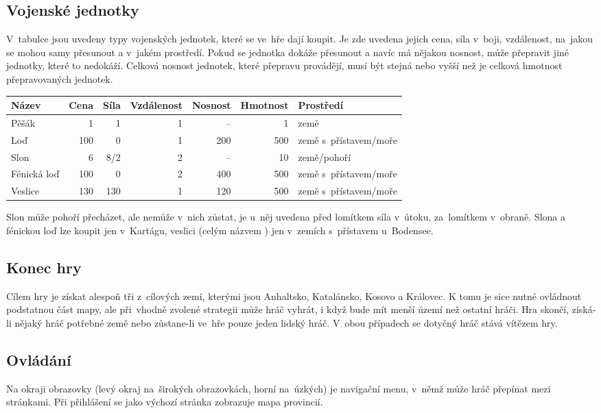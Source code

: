\documentclass[a4paper,12pt]{article}
\begin{document}
\subsection{Vojenské jednotky}
V~tabulce jsou uvedeny typy vojenských jednotek, které se ve~hře dají koupit. Je zde uvedena jejich cena, síla v~boji, vzdálenost, na~jakou se mohou samy přesunout a v~jakém prostředí. Pokud se jednotka dokáže přesunout a navíc má nějakou nosnost, může přepravit jiné jednotky, které to nedokáží. Celková nosnost jednotek, které přepravu provádějí, musí být stejná nebo vyšší než je celková hmotnost přepravovaných jednotek.

\begin{tabular}{l r r r r r l}
Název		& Cena	& Síla	& Vzdálenost	&Nosnost& Hmotnost	& Prostředí\\ \hline
Pěšák		& 1		& 1		& 1			& --		& 1			& země\\
Loď			& 100	& 0		& 1			& 200	& 500		& země s~přístavem/moře\\
Slon			& 6		& 8/2	& 2			& --		& 10			& země/pohoří\\
Fénická loď	& 100	& 0		& 2			& 400	& 500		& země s~přístavem/moře\\
Veslice		& 130	& 130	& 1			& 120	& 500		& země s~přístavem/moře\\
\end{tabular}

Slon může pohoří přecházet, ale nemůže v~nich zůstat, je u~něj uvedena před lomítkem síla v~útoku, za~lomítkem v~obraně. Slona a fénickou loď lze koupit jen v~Kartágu, veslici (celým názvem ) jen v~zemích s~přístavem u~Bodensee.
\subsection{Konec hry}
Cílem hry je získat alespoň tři z~cílových zemí, kterými jsou Anhaltsko, Katalánsko, Kosovo a Královec. K tomu je sice nutné ovládnout podstatnou část mapy, ale při~vhodně zvolené strategii může hráč vyhrát, i když bude mít menší území než ostatní hráči. Hra skončí, získá-li nějaký hráč potřebné země nebo zůstane-li ve~hře pouze jeden lidský hráč. V~obou případech se dotyčný hráč stává vítězem hry.
\subsection{Ovládání}
Na okraji obrazovky (levý okraj na~širokých obrazovkách, horní na~úzkých) je navigační menu, v~němž může hráč přepínat mezi stránkami. Při přihlášení se jako výchozí stránka zobrazuje mapa provincií.
\end{document}

